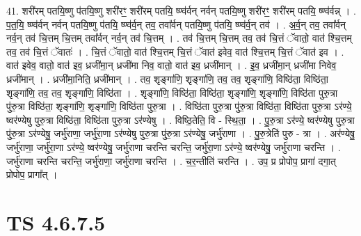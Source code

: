 \documentclass[17pt]{extarticle}
\begin{document}
41. शरी॑रम् पतयि॒ष्णु प॑तयि॒ष्णु शरी॑रꣳ॒॒ शरी॑रम् पतयि॒ ष्ण्व॑र्वन् नर्वन् पतयि॒ष्णु शरी॑रꣳ॒॒ शरी॑रम् पतयि॒ ष्ण्व॑र्वन्न् । . प॒त॒यि॒ ष्ण्व॑र्वन् नर्वन् पतयि॒ष्णु प॑तयि॒ ष्ण्व॑र्व॒न् तव॒ तवा᳚र्वन् पतयि॒ष्णु प॑तयि॒ ष्ण्व॑र्व॒न् तव॑ । . अ॒र्व॒न् तव॒ तवा᳚र्वन् नर्व॒न् तव॑ चि॒त्तम् चि॒त्तम् तवा᳚र्वन् नर्व॒न् तव॑ चि॒त्तम् । . तव॑ चि॒त्तम् चि॒त्तम् तव॒ तव॑ चि॒त्तं ॅवातो॒ वात॑ श्चि॒त्तम् तव॒ तव॑ चि॒त्तं ॅवातः॑ । . चि॒त्तं ॅवातो॒ वात॑ श्चि॒त्तम् चि॒त्तं ॅवात॑ इवेव॒ वात॑ श्चि॒त्तम् चि॒त्तं ॅवात॑ इव । . वात॑ इवेव॒ वातो॒ वात॑ इव॒ ध्रजी॑मा॒न् ध्रजी॑मा निव॒ वातो॒ वात॑ इव॒ ध्रजी॑मान् । . इ॒व॒ ध्रजी॑मा॒न् ध्रजी॑मा निवेव॒ ध्रजी॑मान् । . ध्रजी॑मा॒निति॒ ध्रजी॑मान् । . तव॒ शृङ्गा॑णि॒ शृङ्गा॑णि॒ तव॒ तव॒ शृङ्गा॑णि॒ विष्ठि॑ता॒ विष्ठि॑ता॒ शृङ्गा॑णि॒ तव॒ तव॒ शृङ्गा॑णि॒ विष्ठि॑ता । . शृङ्गा॑णि॒ विष्ठि॑ता॒ विष्ठि॑ता॒ शृङ्गा॑णि॒ शृङ्गा॑णि॒ विष्ठि॑ता पुरु॒त्रा पु॑रु॒त्रा विष्ठि॑ता॒ शृङ्गा॑णि॒ शृङ्गा॑णि॒ विष्ठि॑ता पुरु॒त्रा । . विष्ठि॑ता पुरु॒त्रा पु॑रु॒त्रा विष्ठि॑ता॒ विष्ठि॑ता पुरु॒त्रा ऽर॑ण्ये॒ ष्वर॑ण्येषु पुरु॒त्रा विष्ठि॑ता॒ विष्ठि॑ता पुरु॒त्रा ऽर॑ण्येषु । . विष्ठि॒तेति॒ वि - स्थि॒ता॒ । . पु॒रु॒त्रा ऽर॑ण्ये॒ ष्वर॑ण्येषु पुरु॒त्रा पु॑रु॒त्रा ऽर॑ण्येषु॒ जर्भु॑राणा॒ जर्भु॑रा॒णा ऽर॑ण्येषु पुरु॒त्रा पु॑रु॒त्रा ऽर॑ण्येषु॒ जर्भु॑राणा । . पु॒रु॒त्रेति॑ पुरु - त्रा । . अर॑ण्येषु॒ जर्भु॑राणा॒ जर्भु॑रा॒णा ऽर॑ण्ये॒ ष्वर॑ण्येषु॒ जर्भु॑राणा चरन्ति चरन्ति॒ जर्भु॑रा॒णा ऽर॑ण्ये॒
ष्वर॑ण्येषु॒ जर्भु॑राणा चरन्ति । . जर्भु॑राणा चरन्ति चरन्ति॒ जर्भु॑राणा॒ जर्भु॑राणा चरन्ति । . च॒र॒न्तीति॑ चरन्ति । . उप॒ प्र प्रोपोप॒ प्रागा॑ दगा॒त् प्रोपोप॒ प्रागा᳚त् । \newline
\pagebreak
{}

\section{ TS 4.6.7.5 }
\end{document}
